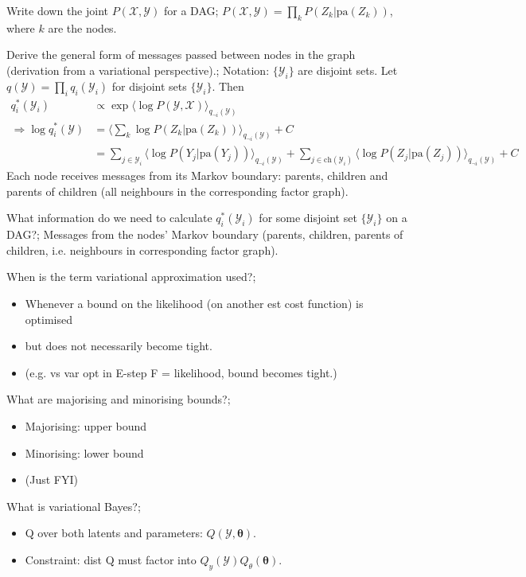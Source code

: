 \documentclass{article}
\begin{document}
Write down the joint $P(\mathcal{X, Y})$ for a DAG; $P(\mathcal{X, Y}) = \prod_k P(Z_k|\text{pa}(Z_k))$, where $k$ are the nodes.

Derive the general form of messages passed between nodes in the graph (derivation from a variational perspective).; Notation: $\{\mathcal{Y}_i\}$ are disjoint sets.  Let $q(\mathcal{Y}) = \prod_iq_i(\mathcal{Y}_i)$ for disjoint sets $\{\mathcal{Y}_i\}$. Then \begin{align*} q_i^*(\mathcal{Y}_i) &\propto \exp \langle \log P(\mathcal{Y, X}) \rangle_{q_{\neg i}(\mathcal{Y})} \\ \Rightarrow \log q^*_i(\mathcal{Y}) &= \langle \sum_k \log P(Z_k |\text{pa}(Z_k)) \rangle_{q_{\neg i}(\mathcal{Y})} + C\\ &= \sum_{j\in \mathcal{Y}_i} \langle\log P(Y_j |\text{pa}(Y_j)) \rangle_{q_{\neg i}(\mathcal{Y})} +  \sum_{j\in \text{ch}(\mathcal{Y}_i)} \langle \log P(Z_j |\text{pa}(Z_j)) \rangle_{q_{\neg i}(\mathcal{Y})} + C \end{align*} Each node receives messages from its Markov boundary: parents, children and parents of children (all neighbours in the corresponding factor graph).

What information do we need to calculate $q_i^*(\mathcal{Y}_i)$ for some disjoint set $\{\mathcal{Y}_i\}$ on a DAG?; Messages from the nodes' Markov boundary (parents, children, parents of children, i.e. neighbours in corresponding factor graph).

When is the term variational approximation used?; \begin{itemize} \item Whenever a bound on the likelihood (on another est cost function) is optimised \item but does not necessarily become tight.  \item (e.g. vs var opt in E-step F = likelihood, bound becomes tight.) \end{itemize}

What are majorising and minorising bounds?; \begin{itemize} \item Majorising: upper bound \item Minorising: lower bound \item (Just FYI) \end{itemize}

What is variational Bayes?; \begin{itemize} \item Q over both latents and parameters: $Q(\mathcal{Y}, \bm{\theta})$.  \item Constraint: dist Q must factor into $Q_y(\mathcal{Y})Q_\theta(\bm{\theta})$.  \end{itemize}
\end{document}
